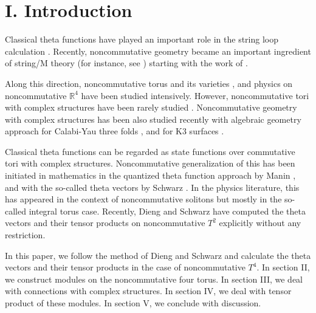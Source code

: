\documentclass[12pt, a4paper]{article}
\newcommand{\R}{{\mathbb R}}
\begin{document}
\vfill


\thispagestyle{empty}

\newpage
\section*{I. Introduction}

Classical theta functions have played an important role in the
string loop calculation \cite{jp,gsw}. Recently, noncommutative
geometry \cite{conn} became an important ingredient of string/M
theory (for instance, see \cite{sw99}) starting with the work of
\cite{cds}.

Along this direction, noncommutative torus \cite{cr,rief88} and
its varieties \cite{nct,hv,t4ours}, and physics on noncommutative
${\R}^4$ \cite{ns98,gms00,dn01} have been studied intensively.
However, noncommutative tori with complex structures have been
rarely studied \cite{manin,schwarz01,ds02}. Noncommutative
geometry with complex structures has been also studied recently
with algebraic geometry approach for Calabi-Yau three folds
\cite{bl,bs1,bs2}, and for K3 surfaces \cite{kl}.

Classical theta functions can be regarded as state functions over
commutative tori with complex structures. Noncommutative
generalization of this has been initiated in mathematics in the
quantized theta function approach by Manin \cite{manin}, and with
the so-called theta vectors by Schwarz \cite{schwarz01}. In the
physics literature, this has appeared in the context of
noncommutative solitons \cite{mm01,ghs01,hsy02} but mostly in the
so-called integral torus case. Recently, Dieng and Schwarz
\cite{ds02} have computed the theta vectors and their tensor
products on noncommutative $T^2$ explicitly without any
restriction.

In this paper, we follow the method of Dieng and Schwarz and
calculate the theta vectors and their tensor products in the case
of noncommutative $T^4$.
 In section II, we construct modules on
the noncommutative four torus. In section III, we deal with
connections with complex structures. In section IV, we deal with
tensor product of these modules. In section V, we conclude with
discussion.
\\


\end{document}
